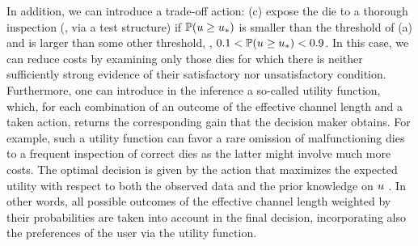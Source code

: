 In addition, we can introduce a trade-off action: (c) expose the die to a thorough inspection (\eg, via a test structure) if $\mathbb{P}(u \geq u_*)$ is smaller than the threshold of (a) and is larger than some other threshold, \eg, $0.1 < \mathbb{P}(u \geq u_*) < 0.9$. In this case, we can reduce costs by examining only those dies for which there is neither sufficiently strong evidence of their satisfactory nor unsatisfactory condition.
Furthermore, one can introduce in the inference a so-called utility function, which, for each combination of an outcome of the effective channel length and a taken action, returns the corresponding gain that the decision maker obtains.
For example, such a utility function can favor a rare omission of malfunctioning dies to a frequent inspection of correct dies as the latter might involve much more costs.
The optimal decision is given by the action that maximizes the expected utility with respect to both the observed data and the prior knowledge on $u$ \cite{bernardo2007}.
In other words, all possible outcomes of the effective channel length weighted by their probabilities are taken into account in the final decision, incorporating also the preferences of the user via the utility function.
